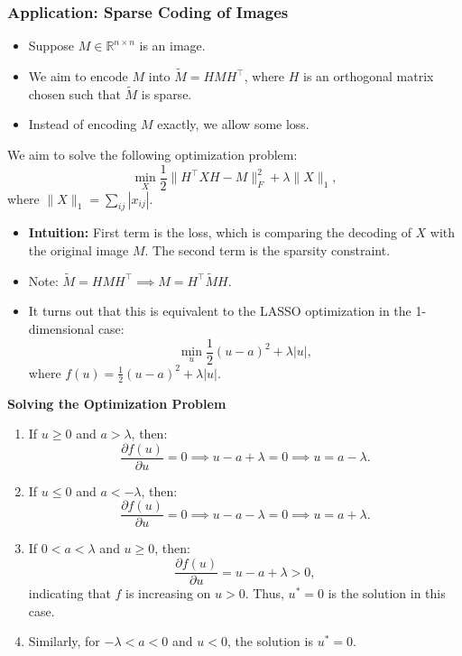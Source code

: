 \subsubsection{Application: Sparse Coding of Images}
\begin{example}
    \begin{itemize}
        \item Suppose $M \in \mathbb{R}^{n \times n}$ is an image.
        \item We aim to encode $M$ into $\tilde{M} = H M H^\top$, where $H$ is an orthogonal matrix chosen such that $\tilde{M}$ is sparse.
        \item Instead of encoding $M$ exactly, we allow some loss.
    \end{itemize}
    \vspace{1em}

    We aim to solve the following optimization problem:
    \[
    \min_X \frac{1}{2} \|H^\top X H - M\|_F^2 + \lambda \|X\|_1,
    \]
    where $\|X\|_1 = \sum_{ij} |x_{ij}|$.

    \begin{itemize}
        \item \textbf{Intuition:} First term is the loss, which is comparing the decoding of $X$ with the original image $M$. The second term is the sparsity constraint.
        \item Note: $\tilde{M} = H M H^\top \implies M = H^\top \tilde{M} H$.
        \item It turns out that this is equivalent to the LASSO optimization in the 1-dimensional case:
        \[
        \min_u \frac{1}{2} (u - a)^2 + \lambda |u|,
        \]
        where $f(u) = \frac{1}{2} (u - a)^2 + \lambda |u|$.
    \end{itemize}
    \vspace{1em}

    \textbf{Solving the Optimization Problem}
    \begin{enumerate}
        \item If $u \geq 0$ and $a > \lambda$, then:
        \[
        \frac{\partial f(u)}{\partial u} = 0 \implies u - a + \lambda = 0 \implies u = a - \lambda.
        \]

        \item If $u \leq 0$ and $a < -\lambda$, then:
        \[
        \frac{\partial f(u)}{\partial u} = 0 \implies u - a - \lambda = 0 \implies u = a + \lambda.
        \]

        \item If $0 < a < \lambda$ and $u \geq 0$, then:
        \[
        \frac{\partial f(u)}{\partial u} = u - a + \lambda > 0,
        \]
        indicating that $f$ is increasing on $u > 0$. Thus, $u^* = 0$ is the solution in this case.

        \item Similarly, for $-\lambda < a < 0$ and $u < 0$, the solution is $u^* = 0$.
    \end{enumerate}
\end{example}

